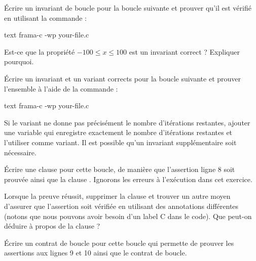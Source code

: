 


Écrire un invariant de boucle pour la boucle suivante et prouver qu'il est vérifié
en utilisant la commande :


\begin{CodeBlock}{text}
frama-c -wp your-file.c
\end{CodeBlock}




Est-ce que la propriété $-100 \leq x \leq 100$ est un invariant correct ?
Expliquer pourquoi.






Écrire un invariant et un variant corrects pour la boucle suivante et prouver
l'ensemble à l'aide de la commande :

\begin{CodeBlock}{text}
frama-c -wp your-file.c
\end{CodeBlock}




Si le variant ne donne pas précisément le nombre d'itérations restantes, ajouter
une variable qui enregistre exactement le nombre d'itérations restantes et l'utiliser
comme variant. Il est possible qu'un invariant supplémentaire soit nécessaire.






Écrire une clause  pour cette boucle, de manière que
l'assertion ligne 8 soit prouvée ainsi que la clause .
Ignorons les erreurs à l'exécution dans cet exercice.





Lorsque la preuve réussit, supprimer la clause  et
trouver un autre moyen d'assurer que l'assertion soit vérifiée en utilisant des
annotations différentes (notons que nous pouvons avoir besoin d'un label C dans
le code). Que peut-on déduire à propos de la clause  ?






Écrire un contrat de boucle pour cette boucle qui permette de prouver les
assertions aux lignes 9 et 10 ainsi que le contrat de boucle.




